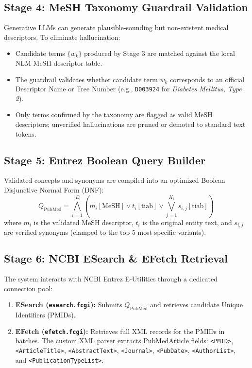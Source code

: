 \documentclass[conference]{IEEEtran}
\begin{document}
\subsection{Stage 4: MeSH Taxonomy Guardrail Validation}
Generative LLMs can generate plausible-sounding but non-existent medical descriptors. To eliminate hallucination:
\begin{itemize}
    \item Candidate terms $\{w_k\}$ produced by Stage 3 are matched against the local NLM MeSH descriptor table.
    \item The guardrail validates whether candidate term $w_k$ corresponds to an official Descriptor Name or Tree Number (e.g., \texttt{D003924} for \textit{Diabetes Mellitus, Type 2}).
    \item Only terms confirmed by the taxonomy are flagged as valid MeSH descriptors; unverified hallucinations are pruned or demoted to standard text tokens.
\end{itemize}

\subsection{Stage 5: Entrez Boolean Query Builder}
Validated concepts and synonyms are compiled into an optimized Boolean Disjunctive Normal Form (DNF):
\begin{equation}
Q_{\text{PubMed}} = \bigwedge_{i=1}^{|E|} \left( m_i[\text{MeSH}] \lor t_i[\text{tiab}] \lor \bigvee_{j=1}^{K_i} s_{i,j}[\text{tiab}] \right)
\end{equation}
where $m_i$ is the validated MeSH descriptor, $t_i$ is the original entity text, and $s_{i,j}$ are verified synonyms (clamped to the top 5 most specific variants).

\subsection{Stage 6: NCBI ESearch \& EFetch Retrieval}
The system interacts with NCBI Entrez E-Utilities through a dedicated connection pool:
\begin{enumerate}
    \item \textbf{ESearch (\texttt{esearch.fcgi}):} Submits $Q_{\text{PubMed}}$ and retrieves candidate Unique Identifiers (PMIDs).
    \item \textbf{EFetch (\texttt{efetch.fcgi}):} Retrieves full XML records for the PMIDs in batches. The custom XML parser extracts PubMedArticle fields: \texttt{<PMID>}, \texttt{<ArticleTitle>}, \texttt{<AbstractText>}, \texttt{<Journal>}, \texttt{<PubDate>}, \texttt{<AuthorList>}, and \texttt{<PublicationTypeList>}.
\end{enumerate}
\end{document}

